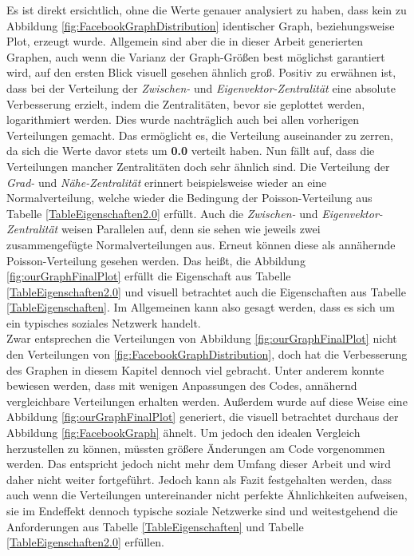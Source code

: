 Es ist direkt ersichtlich, ohne die Werte genauer analysiert zu haben, dass kein zu Abbildung \ref{fig:FacebookGraphDistribution} identischer Graph, beziehungsweise Plot, erzeugt wurde. Allgemein sind aber die in dieser Arbeit generierten Graphen, auch wenn die Varianz der Graph-Größen best möglichst garantiert wird, auf den ersten Blick visuell gesehen ähnlich groß. Positiv zu erwähnen ist, dass bei der Verteilung der \textit{Zwischen-} und \textit{Eigenvektor-Zentralität} eine absolute Verbesserung erzielt, indem die Zentralitäten, bevor sie geplottet werden, logarithmiert werden. Dies wurde nachträglich auch bei allen vorherigen Verteilungen gemacht. Das ermöglicht es, die Verteilung auseinander zu zerren, da sich die Werte davor stets um \textbf{0.0} verteilt haben. Nun fällt auf, dass die Verteilungen mancher Zentralitäten doch sehr ähnlich sind. Die Verteilung der \textit{Grad-} und \textit{Nähe-Zentralität} erinnert beispielsweise wieder an eine Normalverteilung, welche wieder die Bedingung der Poisson-Verteilung aus Tabelle \ref{TableEigenschaften2.0} erfüllt. Auch die \textit{Zwischen-} und \textit{Eigenvektor-Zentralität} weisen Parallelen auf, denn sie sehen wie jeweils zwei zusammengefügte Normalverteilungen aus. Erneut können diese als annähernde Poisson-Verteilung gesehen werden. Das heißt, die Abbildung \ref{fig:ourGraphFinalPlot} erfüllt die Eigenschaft aus Tabelle \ref{TableEigenschaften2.0} und visuell betrachtet auch die Eigenschaften aus Tabelle \ref{TableEigenschaften}. Im Allgemeinen kann also gesagt werden, dass es sich um ein typisches soziales Netzwerk handelt. \\

Zwar entsprechen die Verteilungen von Abbildung \ref{fig:ourGraphFinalPlot} nicht den Verteilungen von \ref{fig:FacebookGraphDistribution}, doch hat die Verbesserung des Graphen in diesem Kapitel dennoch viel gebracht. Unter anderem konnte bewiesen werden, dass mit wenigen Anpassungen des Codes, annähernd vergleichbare Verteilungen erhalten werden. Außerdem wurde auf diese Weise eine Abbildung \ref{fig:ourGraphFinalPlot} generiert, die visuell betrachtet durchaus der Abbildung \ref{fig:FacebookGraph} ähnelt. Um jedoch den idealen Vergleich herzustellen zu können, müssten größere Änderungen am Code vorgenommen werden. Das entspricht jedoch nicht mehr dem Umfang dieser Arbeit und wird daher nicht weiter fortgeführt. Jedoch kann als Fazit festgehalten werden, dass auch wenn die Verteilungen untereinander nicht perfekte Ähnlichkeiten aufweisen, sie im Endeffekt dennoch typische soziale Netzwerke sind und weitestgehend die Anforderungen aus Tabelle \ref{TableEigenschaften} und Tabelle \ref{TableEigenschaften2.0} erfüllen. 




